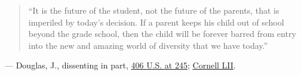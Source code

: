 \documentclass[12pt]{article}
\begin{document}
\begin{quote}
``It is the future of the student, not the future of the parents, that is imperiled by today's decision. If a parent keeps his child out of school beyond the grade school, then the child will be forever barred from entry into the new and amazing world of diversity that we have today.''
\end{quote}
\noindent --- Douglas, J., dissenting in part, \href{https://supreme.justia.com/cases/federal/us/406/205/}{406 U.S. at 245}; \href{https://www.law.cornell.edu/supremecourt/text/406/205}{Cornell LII}.
\end{document}
